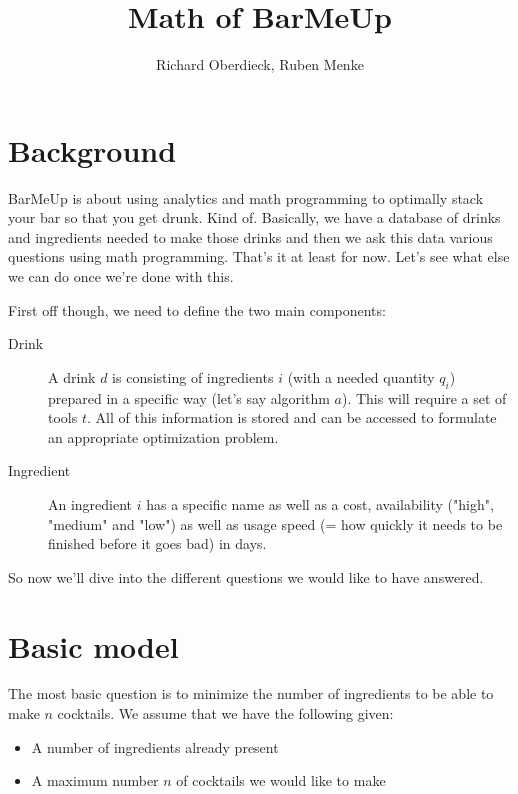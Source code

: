 \documentclass{article}
\author{Richard Oberdieck, Ruben Menke}
\title{Math of BarMeUp}
\begin{document}
\maketitle

\section{Background}
BarMeUp is about using analytics and math programming to optimally stack your bar so that you get drunk. Kind of. Basically, we have a database of drinks and ingredients needed to make those drinks and then we ask this data various questions using math programming. That's it at least for now. Let's see what else we can do once we're done with this.

First off though, we need to define the two main components:
\begin{description}
\item[Drink]{A drink $d$ is consisting of ingredients $i$ (with a needed quantity $q_i$) prepared in a specific way (let's say algorithm $a$). This will require a set of tools $t$. All of this information is stored and can be accessed to formulate an appropriate optimization problem.}
\item[Ingredient]{An ingredient $i$ has a specific name as well as a cost, availability ("high", "medium" and "low") as well as usage speed (= how quickly it needs to be finished before it goes bad) in days.}
\end{description}


So now we'll dive into the different questions we would like to have answered.

\section{Basic model}
The most basic question is to minimize the number of ingredients to  be able to make $n$ cocktails. We assume that we have the following given:
\begin{itemize}
\item{A number of ingredients already present}
\item{A maximum number $n$ of cocktails we would like to make}
\end{itemize}

\end{document}
